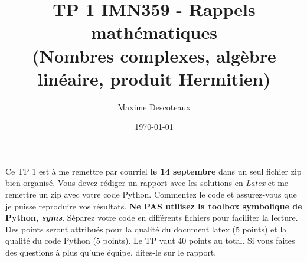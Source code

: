 \documentclass{article}
\title{TP 1 IMN359 - Rappels mathématiques \\
(Nombres complexes, algèbre linéaire, produit Hermitien)}
\author{Maxime Descoteaux}
\date{\today}
\begin{document}
\maketitle

Ce TP 1 est à me remettre par courriel {\bf le 14 septembre} 
dans un seul fichier zip bien organisé. 
Vous devez rédiger un rapport avec les solutions en 
\emph{Latex} et me remettre un zip avec votre code Python. Commentez
le code et assurez-vous que je puisse reproduire vos 
résultats. {\bf Ne PAS utilisez la toolbox symbolique de Python,
  \emph{syms}}. Séparez votre code en différents fichiers pour faciliter la
lecture. Des points seront attribués pour la qualité du document latex
(5 points) et la qualité du code Python (5 points). Le TP vaut 40
points au total. Si vous faites des questions à plus qu'une équipe,
dites-le sur le rapport. 
\end{document}
